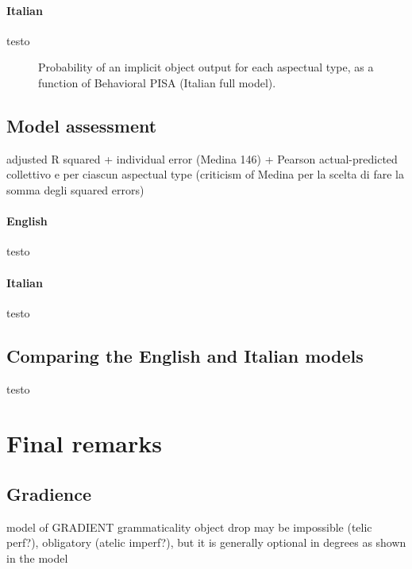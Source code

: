 \paragraph{Italian} testo

\begin{figure}[htb]
\caption{Probability of an implicit object output for each aspectual type, as a function of Behavioral PISA (Italian full model).}
    
\end{figure}


\subsection{Model assessment} 

adjusted R squared + 
individual error (Medina 146) +
Pearson actual-predicted collettivo e per ciascun aspectual type
(criticism of Medina per la scelta di fare la somma degli squared errors)

\paragraph{English} testo

\paragraph{Italian} testo


\subsection{Comparing the English and Italian models} 

testo



\section{Final remarks} 


\subsection{Gradience} 

model of GRADIENT grammaticality
object drop may be impossible (telic perf?), obligatory (atelic imperf?), but it is generally optional in degrees as shown in the model


